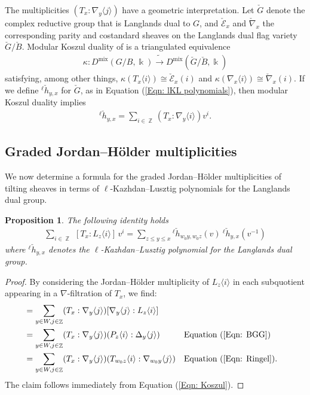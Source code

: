 \documentclass[11pt]{article}
\DeclareMathOperator{\mix}{mix}
\DeclareMathOperator{\Z}{\mathbb{Z}}
\newtheorem{prop}[thm]{Proposition}
\theoremstyle{remark}
\theoremstyle{definition}
\begin{document}
    The multiplicities $(T_x : \nabla_y \langle j \rangle)$ have a geometric interpretation. 
	Let $\check{G}$ denote the complex reductive group that is Langlands dual to $G$,
	and $\check{\mathscr{E}}_x$ and $\check{\nabla}_x$ the corresponding parity and costandard sheaves on the Langlands dual flag variety $\check{G}/ \check{B}$. 
    Modular Koszul duality of \cite{AR16,AMRW19,RV24} is a triangulated equivalence 
    \begin{align*}
    	\kappa: D^{\mix}(G/B, \Bbbk) \tilde{\longrightarrow} D^{\mix}(\check{G}/\check{B}, \Bbbk)
    \end{align*}
    satisfying, among other things, $\kappa(T_x \langle i\rangle ) \cong \check{\mathscr{E}}_x(i)$ and $\kappa(\nabla_x \langle i\rangle ) \cong \check{\nabla}_x(i) $. 
    If we define ${}^{\ell}\check{h}_{y,x}$ for $\check{G}$, as in Equation (\ref{Eqn: lKL polynomials}), then modular Koszul duality implies 
    \begin{align}
\label{Eqn: Koszul}
		{}^{\ell} \check{h}_{y,x}
		=
		\sum_{i \in \Z} (T_x : \nabla_y \langle i \rangle) v^i.
	\end{align}
	 

\subsection{Graded Jordan--H\"{o}lder multiplicities}
	
	We now determine a formula for the graded Jordan--H\"{o}lder multiplicities of tilting sheaves in terms of $\ell$-Kazhdan--Lusztig polynomials for the Langlands dual group.  
	
	\begin{prop}
\label{Prop: Tilting JH mult}
		The following identity holds
		\begin{align*}
			\sum_{i \in \Z} ~[T_x : L_z \langle i \rangle] \, v^i
			=
			\sum_{z \leq y \leq x} {}^{\ell} \check{h}_{w_0 y, w_0 z}(v) ~{}^{\ell} \check{h}_{y,x}(v^{-1})
		\end{align*}
		where ${}^\ell \check{h}_{y,x}$ denotes the $\ell$-Kazhdan--Lusztig polynomial for the Langlands dual group.
	\end{prop}
	
	\begin{proof}
	By considering the Jordan--H\"{o}lder multiplicity of $L_{z}\langle i \rangle$ in each subquotient appearing in a $\nabla$-filtration of $T_x$, we find:
	\begin{align*}
		[T_x : L_z \langle i \rangle]
		&= 
		\sum_{y \in W, j \in \Z} 
		(T_x : \nabla_y \langle j \rangle)
		[\nabla_y \langle j \rangle : L_z \langle i \rangle]
		\\
		&=
		\sum_{y \in W, j \in \Z}
		(T_x : \nabla_y \langle j \rangle)
		(P_{z} \langle i \rangle  : \Delta_{y} \langle j \rangle )
		&&
		\text{Equation (\ref{Eqn: BGG})}
		\\
		&=
		\sum_{y \in W, j \in \Z}
		(T_x : \nabla_y \langle j \rangle)
		(T_{w_0 z} \langle i \rangle : \nabla_{w_0y} \langle j \rangle)
		&&
		\text{Equation (\ref{Eqn: Ringel})}.
	\end{align*}
	The claim follows immediately from Equation (\ref{Eqn: Koszul}).
	\end{proof}
	
\end{document}
